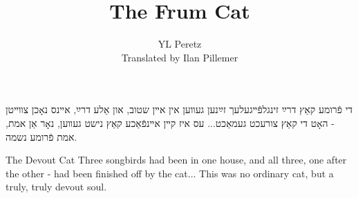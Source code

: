 \documentclass{book}
\begin{document}
\title{The Frum Cat}
\author{YL Peretz\\Translated by Ilan Pillemer}
\date{}

\maketitle
\begin{pairs}

\begin{Rightside}
\begin{RTL}
\begin{hebrew}
\beginnumbering
\pstart
די פֿרומע קאַץ
\newline
\pend
\pstart
דרײַ זינגלפֿײגעלעך זײַנען געװען אין אײן שטוב, און אַלע דרײַ, אײנס נאָכן צװײטן - האָט די קאַץ צורעכט געמאַכט...
\pend
\pstart
עס איז קײן אײנפֿאַכע קאַץ נישט געװען, נאָר אַן אמת, אמת פֿרומע נשמה.

\pend
\endnumbering
\end{hebrew}
\end{RTL}
\end{Rightside}




\begin{Leftside}
\begin{english}
\beginnumbering
\pstart
The Devout Cat
\newline
\pend
\pstart
Three songbirds had been in one house, and all three, one after the other - had been finished off by the cat...
\pend
\pstart
This was no ordinary cat, but a truly, truly devout soul.
\pend
\endnumbering
\end{english}
\end{Leftside}

\end{pairs}
\Columns
\end{document}
